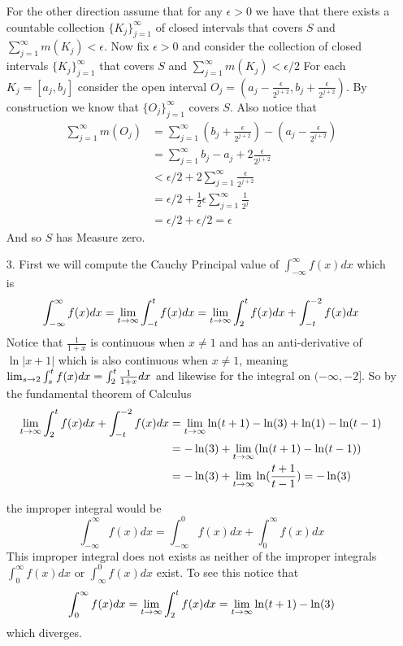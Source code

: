 \documentclass[12pt]{amsart}
\begin{document}
\begin{itemize}
             For the other direction assume that for any $\epsilon>0$ we have that there exists a
             countable collection $\{{K_j}\}_{j=1}^\infty$ of closed intervals that covers 
             $S$ and $\sum_{j=1}^\infty m(K_j)<\epsilon$. Now fix $\epsilon>0$ and consider the collection of 
             closed intervals $\{{K_j}\}_{j=1}^\infty$ that covers $S$ and $\sum_{j=1}^\infty m(K_j)<\epsilon/2$
             For each $K_j=[a_j,b_j]$ consider the open interval $O_j=(a_j-\frac{\epsilon}{2^{j+2}},b_j+\frac{\epsilon}{2^{j+2}})$.
             By construction we know that $\{{O_j}\}_{j=1}^\infty$ covers $S$. Also notice that
             \begin{align*}
               \sum_{j=1}^\infty m(O_j)&=\sum_{j=1}^\infty (b_j+\frac{\epsilon}{2^{j+2}})-(a_j-\frac{\epsilon}{2^{j+2}})\\
               &=\sum_{j=1}^\infty b_j-a_j+2\frac{\epsilon}{2^{j+2}}\\
               &<\epsilon/2 +2\sum_{j=1}^\infty \frac{\epsilon}{2^{j+2}}\\
               &=\epsilon/2 +\frac{1}{2}\epsilon\sum_{j=1}^\infty \frac{1}{2^j}\\
               &=\epsilon/2+\epsilon/2=\epsilon
             \end{align*}
             And so $S$ has Measure zero.
         
   \item[3.] First we will compute the Cauchy Principal value of $\int_{-\infty}^\infty f(x)dx$ which is 
            \[\int_{-\infty}^\infty f(x)dx =\lim_{t\rightarrow\infty}\int_{-t}^t f(x)dx 
            = \lim_{t\rightarrow\infty}\int_{2}^t f(x)dx + \int_{-t}^{-2} f(x)dx \]
            Notice that $\frac{1}{1+x}$ is continuous when $x\neq 1$ and has an anti-derivative of $\ln|x+1|$ 
            which is also continuous when $x\neq 1$, meaning $\lim_{s\rightarrow 2}\int_{s}^t f(x)dx=\int_{2}^t \frac{1}{1+x}dx$ 
            and likewise for the integral on $(-\infty,-2]$. So by the fundamental theorem of Calculus
            \begin{align*}
               \lim_{t\rightarrow\infty}\int_{2}^t f(x)dx + \int_{-t}^{-2} f(x)dx 
               &=\lim_{t\rightarrow\infty} \ln(t+1)-\ln(3)+ \ln(1)-\ln(t-1)\\
               &=-\ln(3)+\lim_{t\rightarrow\infty}(\ln(t+1)-\ln(t-1))\\
               &=-\ln(3)+\lim_{t\rightarrow\infty}\ln(\frac{t+1}{t-1})=-\ln(3)
            \end{align*}

            the improper integral would be 
            \[\int_{-\infty}^\infty f(x)dx = \int_{-\infty}^0 f(x)dx +\int_{0}^\infty f(x)dx\]
            This improper integral does not exists as neither of the improper integrals
            $\int_{0}^\infty f(x)dx$ or $\int_{\infty}^0 f(x)dx$ exist. To see this notice that
            \[\int_{0}^\infty f(x)dx=\lim_{t\rightarrow\infty}\int_{2}^t f(x)dx=\lim_{t\rightarrow\infty} \ln(t+1)-\ln(3)\]
            which diverges.


\end{itemize}
\end{document}
